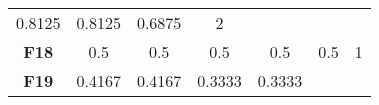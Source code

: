 \documentclass[12pt,a4paper]{article}
\begin{document}
\begin{longtable}[c]{@{}ccccccc@{}}
\begin{minipage}[t]{0.09\columnwidth}\centering\strut
0.8125
\strut\end{minipage} &
\begin{minipage}[t]{0.10\columnwidth}\centering\strut
0.8125
\strut\end{minipage} &
\begin{minipage}[t]{0.11\columnwidth}\centering\strut
0.6875
\strut\end{minipage} &
\begin{minipage}[t]{0.07\columnwidth}\centering\strut
2
\strut\end{minipage}\tabularnewline
\begin{minipage}[t]{0.11\columnwidth}\centering\strut
\textbf{F18}
\strut\end{minipage} &
\begin{minipage}[t]{0.09\columnwidth}\centering\strut
0.5
\strut\end{minipage} &
\begin{minipage}[t]{0.08\columnwidth}\centering\strut
0.5
\strut\end{minipage} &
\begin{minipage}[t]{0.09\columnwidth}\centering\strut
0.5
\strut\end{minipage} &
\begin{minipage}[t]{0.10\columnwidth}\centering\strut
0.5
\strut\end{minipage} &
\begin{minipage}[t]{0.11\columnwidth}\centering\strut
0.5
\strut\end{minipage} &
\begin{minipage}[t]{0.07\columnwidth}\centering\strut
1
\strut\end{minipage}\tabularnewline
\begin{minipage}[t]{0.11\columnwidth}\centering\strut
\textbf{F19}
\strut\end{minipage} &
\begin{minipage}[t]{0.09\columnwidth}\centering\strut
0.4167
\strut\end{minipage} &
\begin{minipage}[t]{0.08\columnwidth}\centering\strut
0.4167
\strut\end{minipage} &
\begin{minipage}[t]{0.09\columnwidth}\centering\strut
0.3333
\strut\end{minipage} &
\begin{minipage}[t]{0.10\columnwidth}\centering\strut
0.3333
\strut\end{minipage} &

\end{longtable}
\end{document}
